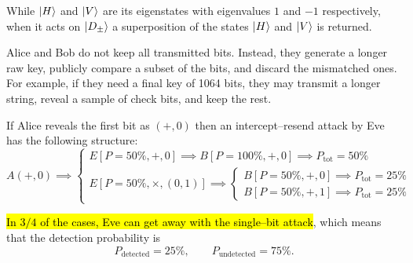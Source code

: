 While $\ket{H}$ and $\ket{V}$ are its eigenstates with eigenvalues $1$ and $-1$ respectively, when it acts on $\ket{D_{\pm}}$ a superposition of the states $\ket{H}$ and $\ket{V}$ is returned.



Alice and Bob do not keep all transmitted bits. Instead, they generate a longer raw key, publicly compare a subset of the bits, and discard the mismatched ones. For example, if they need a final key of 1064 bits, they may transmit a longer string, reveal a sample of check bits, and keep the rest.

If Alice reveals the first bit as $(+,0)$ then an intercept--resend attack by Eve has the following structure:
\begin{equation}\label{5-eve-attack}
A(+,0) \implies
\begin{cases}
E[P=50\%, +,0] \implies B[P=100\%, +,0] \implies P_{\text{tot}} = 50\% \\[2ex]
E[P=50\%, \times, (0,1)] \implies
\begin{cases}
B[P=50\%, +,0] \implies P_{\text{tot}} = 25\% \\[0.5ex]
B[P=50\%, +,1] \implies P_{\text{tot}} = 25\%
\end{cases}
\end{cases}
\end{equation}

\hl{In $3/4$ of the cases, Eve can get away with the single--bit attack}, which means that the detection probability is
\[
P_{\text{detected}} = 25\%,
\qquad
P_{\text{undetected}} = 75\%.
\]

